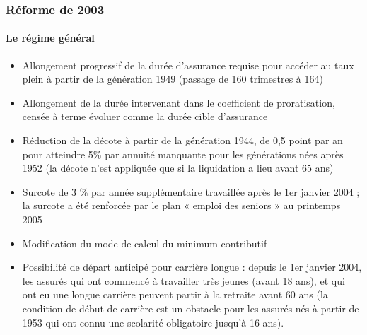 \subsubsection{Réforme de 2003}

\paragraph{Le régime général}

\begin{itemize}
   \item	Allongement progressif de la durée d'assurance requise pour accéder au taux plein à partir de la génération 1949 (passage de 160 
         trimestres à 164)
   \item	Allongement de la durée intervenant dans le coefficient de proratisation, censée à terme évoluer comme la durée cible d'assurance
   \item	Réduction de la décote à partir de la génération 1944, de 0,5 point par an pour atteindre 5\% par annuité manquante pour les 
         générations nées après 1952 (la décote n'est appliquée que si la liquidation a lieu avant 65 ans)
   \item	Surcote de 3 \% par année supplémentaire travaillée après le 1er janvier 2004 ; la surcote a été renforcée par le plan « emploi des 
seniors » au printemps 2005
   \item	Modification du mode de calcul du minimum contributif
   \item	Possibilité de départ anticipé pour carrière longue : depuis le 1er janvier 2004, les assurés qui ont commencé à travailler très 
         jeunes (avant 18 ans), et qui ont eu une longue carrière  peuvent partir à la retraite avant 60 ans (la condition de début de carrière est 
         un obstacle pour les assurés nés à partir de 1953 qui ont connu une scolarité obligatoire jusqu'à 16 ans).
\end{itemize}

